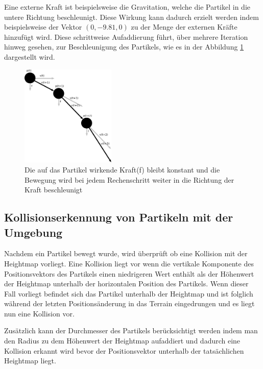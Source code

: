 \begin{Spacing}{\mylinespace}
        Eine externe Kraft ist beispielsweise die Gravitation, welche die Partikel
        in die untere Richtung beschleunigt. Diese Wirkung kann dadurch erzielt
        werden indem beispielsweise der Vektor $( 0,-9.81,0 )$ zu der Menge der externen
        Kräfte hinzufügt wird.
		Diese schrittweise Aufaddierung führt, über mehrere Iteration hinweg gesehen,
		zur Beschleunigung des Partikels, wie es in der Abbildung \ref{fig:bewmod} dargestellt wird.
		\begin{figure}[h!]
			\centering
			\vspace*{30px}
			\includegraphics[width=0.4\textwidth]{graphics/Phys_bew3.png}
			\caption{Die auf das Partikel wirkende Kraft(f) bleibt konstant und
			die Bewegung wird bei jedem Rechenschritt weiter in die Richtung der
			Kraft beschleunigt}
			\label{fig:bewmod}
		\end{figure}

    \subsection{Kollisionserkennung von Partikeln mit der Umgebung}
    	Nachdem ein Partikel bewegt wurde, wird überprüft ob eine Kollision mit
    	der Heightmap vorliegt. Eine Kollision liegt vor wenn die vertikale Komponente
    	des Positionsvektors des Partikels einen niedrigeren Wert enthält als der
    	Höhenwert der Heightmap unterhalb der horizontalen Position des Partikels. Wenn dieser Fall
    	vorliegt befindet sich das Partikel unterhalb der Heightmap und ist
    	folglich während der letzten Positionsänderung in das Terrain eingedrungen
    	und es liegt nun eine Kollision vor.

    	Zusätzlich kann der Durchmesser des Partikels berücksichtigt werden
    	indem man den Radius zu dem Höhenwert der Heightmap aufaddiert und
    	dadurch eine Kollision erkannt wird bevor der Positionsvektor unterhalb
    	der tatsächlichen Heightmap liegt.


\end{Spacing}
